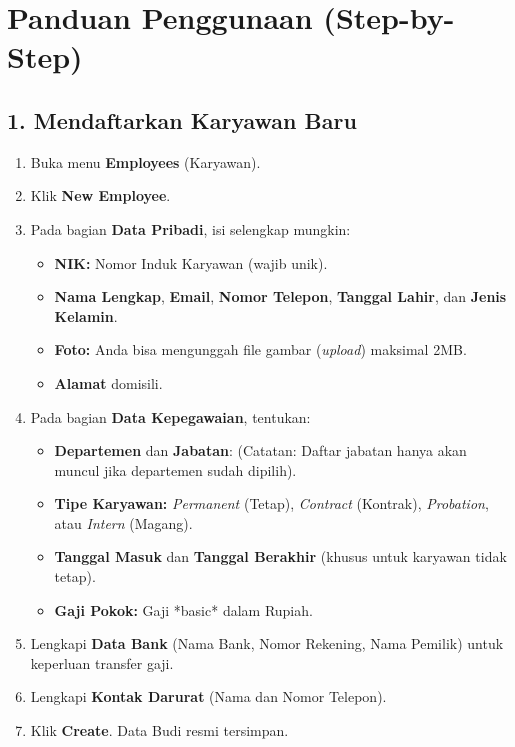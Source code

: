 \section{Panduan Penggunaan (Step-by-Step)}

\subsection{1. Mendaftarkan Karyawan Baru}
\begin{enumerate}
    \item Buka menu \textbf{Employees} (Karyawan).
    \item Klik \textbf{New Employee}.
    \item Pada bagian \textbf{Data Pribadi}, isi selengkap mungkin:
    \begin{itemize}
        \item \textbf{NIK:} Nomor Induk Karyawan (wajib unik).
        \item \textbf{Nama Lengkap}, \textbf{Email}, \textbf{Nomor Telepon}, \textbf{Tanggal Lahir}, dan \textbf{Jenis Kelamin}.
        \item \textbf{Foto:} Anda bisa mengunggah file gambar (\textit{upload}) maksimal 2MB.
        \item \textbf{Alamat} domisili.
    \end{itemize}
    \item Pada bagian \textbf{Data Kepegawaian}, tentukan:
    \begin{itemize}
        \item \textbf{Departemen} dan \textbf{Jabatan}: (Catatan: Daftar jabatan hanya akan muncul jika departemen sudah dipilih).
        \item \textbf{Tipe Karyawan:} \textit{Permanent} (Tetap), \textit{Contract} (Kontrak), \textit{Probation}, atau \textit{Intern} (Magang).
        \item \textbf{Tanggal Masuk} dan \textbf{Tanggal Berakhir} (khusus untuk karyawan tidak tetap).
        \item \textbf{Gaji Pokok:} Gaji *basic* dalam Rupiah.
    \end{itemize}
    \item Lengkapi \textbf{Data Bank} (Nama Bank, Nomor Rekening, Nama Pemilik) untuk keperluan transfer gaji.
    \item Lengkapi \textbf{Kontak Darurat} (Nama dan Nomor Telepon).
    \item Klik \textbf{Create}. Data Budi resmi tersimpan.
\end{enumerate}

